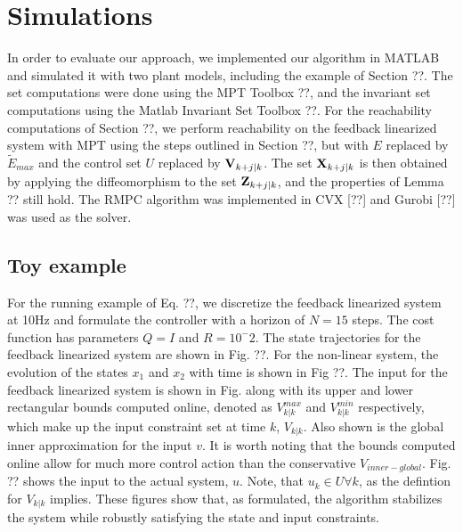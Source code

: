 \section{Simulations}
\label{sec:simulations}

In order to evaluate our approach, we implemented our algorithm in MATLAB and simulated it with two plant models, including the example of Section ??. The set computations were done using the MPT Toolbox ??, and the invariant set computations using the Matlab Invariant Set Toolbox ??. For the reachability computations of Section ??, we perform reachability on the feedback linearized system with MPT using the steps outlined in Section ??, but with $E$ replaced by $\tilde{E}_{max}$ and the control set $U$ replaced by $\mathbf{V}_{k+j|k}$. The set $\mathbf{X}_{k+j|k}$ is then obtained by applying the diffeomorphism to the set $\mathbf{Z}_{k+j|k}$, and the properties of Lemma ?? still hold. The RMPC algorithm was implemented in CVX [??] and Gurobi [??] was used as the solver.

\subsection{Toy example}

For the running example of Eq. ??, we discretize the feedback linearized system at 10Hz and formulate the controller with a horizon of $N=15$ steps. The cost function has parameters $Q=I$ and $R=10^-2$.
The state trajectories for the feedback linearized system are shown in Fig. ??.  For the non-linear system, the evolution of the states $x_1$ and $x_2$ with time is shown in Fig ??. The input for the feedback linearized system is shown in Fig. along with its upper and lower rectangular bounds computed online, denoted as $ V^{max}_{k|k}$ and $ V^{min}_{k|k}$ respectively, which make up the input constraint set at time $k$, $V_{k|k}$. Also shown is the global inner approximation for the input $v$. It is worth noting that the bounds computed online allow for much more control action than the conservative $V_{inner-global}$. Fig. ?? shows the input to the actual system, $u$. Note, that $u_k \in U \forall k$, as the defintion for $V_{k|k}$ implies. These figures show that, as formulated, the algorithm stabilizes the system while robustly satisfying the state and input constraints.

